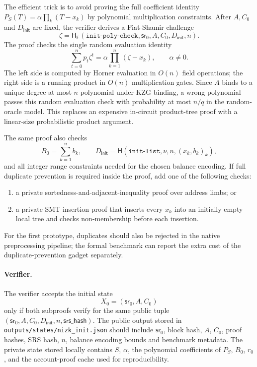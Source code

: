 \documentclass[UTF8,a4paper,11pt]{ctexart}
\newcommand{\F}{\mathbb F}
\newcommand{\Hash}{\mathsf H}
\newcommand{\sr}{\mathsf{sr}}
\begin{document}
The efficient trick is to avoid proving the full coefficient identity
$P_S(T)=\alpha\prod_k(T-x_k)$ by polynomial multiplication constraints.  After $A,C_0$ and
$D_{\mathsf{init}}$ are fixed, the verifier derives a Fiat-Shamir challenge
\[
  \zeta=\Hash_{\F}(\mathtt{init\mbox{-}poly\mbox{-}check},\sr_0,A,C_0,D_{\mathsf{init}},n).
\]
The proof checks the single random evaluation identity
\[
  \sum_{t=0}^{n}p_t\zeta^t
  =
  \alpha\prod_{k=1}^{n}(\zeta-x_k),
  \qquad \alpha\ne 0.
\]
The left side is computed by Horner evaluation in $O(n)$ field operations; the right side is a
running product in $O(n)$ multiplication gates.  Since $A$ binds to a unique degree-at-most-$n$
polynomial under KZG binding, a wrong polynomial passes this random evaluation check with probability
at most $n/q$ in the random-oracle model.  This replaces an expensive in-circuit product-tree proof
with a linear-size probabilistic product argument.

The same proof also checks
\[
  B_0=\sum_{k=1}^{n} b_k,
  \qquad
  D_{\mathsf{init}}=\Hash(\mathtt{init\mbox{-}list},\nu,n,(x_k,b_k)_k),
\]
and all integer range constraints needed for the chosen balance encoding.  If full duplicate
prevention is required inside the proof, add one of the following checks:
\begin{enumerate}[leftmargin=2em]
  \item a private sortedness-and-adjacent-inequality proof over address limbs; or
  \item a private SMT insertion proof that inserts every $x_k$ into an initially empty local tree and
        checks non-membership before each insertion.
\end{enumerate}
For the first prototype, duplicates should also be rejected in the native preprocessing pipeline; the
formal benchmark can report the extra cost of the duplicate-prevention gadget separately.

\paragraph{Verifier.}
The verifier accepts the initial state
\[
  X_0=(\sr_0,A,C_0)
\]
only if both subproofs verify for the same public tuple
$(\sr_0,A,C_0,D_{\mathsf{init}},n,\mathsf{srs\_hash})$.  The public output stored in
\texttt{outputs/states/nizk\_init.json} should include $\sr_0$, block hash, $A$, $C_0$, proof hashes,
SRS hash, $n$, balance encoding bounds and benchmark metadata.  The private state stored locally
contains $S$, $\alpha$, the polynomial coefficients of $P_S$, $B_0$, $r_0$, and the account-proof
cache used for reproducibility.
\end{document}
